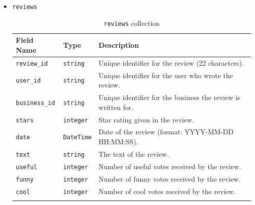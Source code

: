 \documentclass{Configuration_Files/PoliMi3i_thesis}
\begin{document}
\begin{itemize}
\item{\texttt{reviews}}
\begin{longtable}{|p{3cm}|p{3cm}|p{10cm}|}
\hline
\textbf{Field Name} & \textbf{Type} & \textbf{Description} \\ \hline
\texttt{review\_id} & \texttt{string} & Unique identifier for the review (22 characters). \\ \hline
\texttt{user\_id} & \texttt{string} & Unique identifier for the user who wrote the review. \\ \hline
\texttt{business\_id} & \texttt{string} & Unique identifier for the business the review is written for. \\ \hline
\texttt{stars} & \texttt{integer} & Star rating given in the review. \\ \hline
\texttt{date} & \texttt{DateTime} & Date of the review (format: YYYY-MM-DD HH:MM:SS). \\ \hline
\texttt{text} & \texttt{string} & The text of the review. \\ \hline
\texttt{useful} & \texttt{integer} & Number of useful votes received by the review. \\ \hline
\texttt{funny} & \texttt{integer} & Number of funny votes received by the review. \\ \hline
\texttt{cool} & \texttt{integer} & Number of cool votes received by the review. \\ \hline
\caption{\texttt{reviews} collection}
\end{longtable}


\end{itemize}
\end{document}
